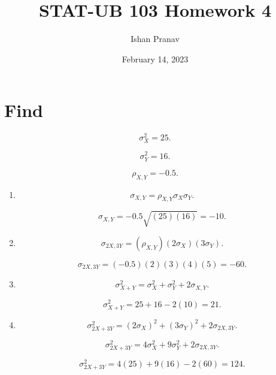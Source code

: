 \documentclass[12pt]{article}
\title{STAT-UB 103 Homework 4}
\author{Ishan Pranav}
\date{February 14, 2023}
\begin{document}
\maketitle
\section{Find}
\[\sigma^2_X=25.\]

\[\sigma^2_Y=16.\]

\[\rho_{X, Y}=-0.5.\]
\begin{enumerate}
\item
\[\sigma_{X, Y}=\rho_{X, Y}\sigma_X\sigma_Y.\]

\[\sigma_{X, Y}=-0.5\sqrt{(25)(16)}=-10.\]
\item
\[\sigma_{2X, 3Y}=(\rho_{X, Y})(2\sigma_X)(3\sigma_Y).\]

\[\sigma_{2X, 3Y}=(-0.5)(2)(3)(4)(5)=-60.\]
\item
\[\sigma^2_{X+Y}=\sigma^2_X+\sigma^2_Y+2\sigma_{X, Y}.\]

\[\sigma^2_{X+Y}=25+16-2(10)=21.\]
\item
\[\sigma^2_{2X+3Y}=(2\sigma_X)^2+(3\sigma_Y)^2+2\sigma_{2X, 3Y}.\]

\[\sigma^2_{2X+3Y}=4\sigma^2_X+9\sigma^2_Y+2\sigma_{2X, 3Y}.\]

\[\sigma^2_{2X+3Y}=4(25)+9(16)-2(60)=124.\]
\end{enumerate}
\end{document}
